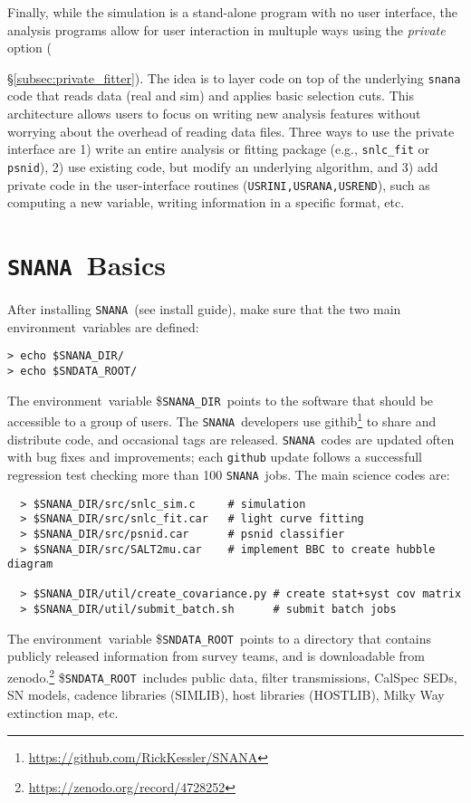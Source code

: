 \documentclass[12pt]{article}
\newcommand{\env}{environment}
\newcommand{\snana}{{\tt SNANA}}
\newcommand{\snanadir}{{\tt SNANA\_DIR}}
\newcommand{\sndataroot}{{\tt SNDATA\_ROOT}}
\begin{document}
Finally, while the simulation is a stand-alone program
with no user interface, the analysis programs allow for
user interaction in multuple ways using the {\it private}
option ({\S\ref{subsec:private_fitter}). The idea is
to layer code on top of the underlying {\tt snana} code that
reads data (real and sim) and applies basic selection cuts.
This architecture allows users to focus on writing new  
analysis features without worrying about the overhead of 
reading data files.
Three ways to use the private interface are
1) write an entire analysis or fitting package
(e.g., {\tt snlc\_fit} or {\tt psnid}),
2) use existing code, but modify an underlying algorithm, and
3) add private code in the user-interface routines 
({\tt USRINI,USRANA,USREND}), such as computing a new variable,
writing information in a specific format, etc.


\clearpage
   \section{\snana\ Basics}
   \label{sec:basics}

After installing \snana\ (see install guide), make sure
that the two main \env\ variables are defined:
%
\begin{verbatim}
> echo $SNANA_DIR/
> echo $SNDATA_ROOT/
\end{verbatim}
%
The \env\ variable \$\snanadir\ points to the software that
should be accessible to a group of users.
The \snana\ developers use 
githib\footnote{\url{https://github.com/RickKessler/SNANA}}
to share and distribute code, and occasional tags are released.
\snana\ codes are updated often with bug fixes and improvements;
each {\tt github} update follows a successfull regression test checking
more than 100 \snana\ jobs.
The main science codes are:
\begin{verbatim}
  > $SNANA_DIR/src/snlc_sim.c     # simulation
  > $SNANA_DIR/src/snlc_fit.car   # light curve fitting
  > $SNANA_DIR/src/psnid.car      # psnid classifier
  > $SNANA_DIR/src/SALT2mu.car    # implement BBC to create hubble diagram

  > $SNANA_DIR/util/create_covariance.py # create stat+syst cov matrix
  > $SNANA_DIR/util/submit_batch.sh      # submit batch jobs
\end{verbatim}
%
The \env\ variable \$\sndataroot\ points to a directory that
contains publicly released information from survey teams,
and is downloadable from 
zenodo.\footnote{\url{https://zenodo.org/record/4728252}}
\$\sndataroot\ includes 
public data, 
filter transmissions,
CalSpec SEDs, 
SN models,
cadence libraries (SIMLIB),
host libraries (HOSTLIB),
Milky Way extinction map, etc.


}
\end{document}
